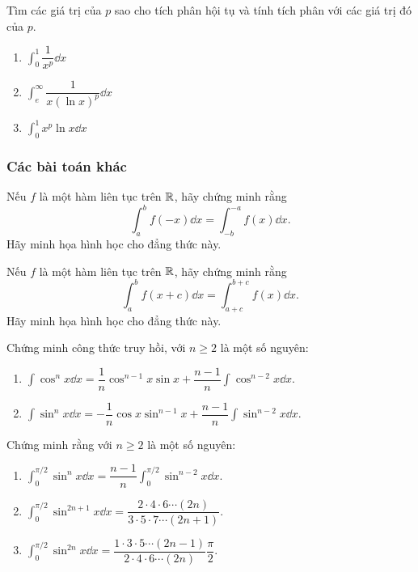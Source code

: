 \begin{exercise}
    Tìm các giá trị của $p$ sao cho tích phân hội tụ và tính tích phân với các giá trị đó của $p$.
    \begin{enumerate}[label=(\alph*)]
        \item $\int_0^1 \dfrac{1}{x^p} \dd x$
        \item $\int_e^\infty \dfrac{1}{x(\ln x)^p} \dd x$
        \item $\int_0^1 x^p \ln x \dd x$
    \end{enumerate}
\end{exercise}

\subsubsection{Các bài toán khác}

\begin{exercise}
    Nếu $f$ là một hàm liên tục trên $\mathbb{R}$, hãy chứng minh rằng
    \[ \int_a^b f(-x) \dd x = \int_{-b}^{-a} f(x) \dd x. \]
    Hãy minh họa hình học cho đẳng thức này.
\end{exercise}

\begin{exercise}
    Nếu $f$ là một hàm liên tục trên $\mathbb{R}$, hãy chứng minh rằng
    \[ \int_a^b f(x+c) \dd x = \int_{a+c}^{b+c} f(x) \dd x. \]
    Hãy minh họa hình học cho đẳng thức này.
\end{exercise}

\begin{exercise}
    Chứng minh công thức truy hồi, với $n \ge 2$ là một số nguyên:
    \begin{enumerate}[label=(\alph*)]
        \item $\int \cos^n x \dd x = \dfrac{1}{n}\cos^{n-1}x \sin x + \dfrac{n-1}{n}\int \cos^{n-2}x \dd x.$
        \item $\int \sin^n x \dd x = -\dfrac{1}{n}\cos x \sin^{n-1}x + \dfrac{n-1}{n}\int \sin^{n-2}x \dd x.$
    \end{enumerate}
\end{exercise}

\begin{exercise}
    Chứng minh rằng với $n \ge 2$ là một số nguyên:
    \begin{enumerate}[label=(\alph*)]
        \item $\int_0^{\pi/2} \sin^n x \dd x = \dfrac{n-1}{n} \int_0^{\pi/2} \sin^{n-2} x \dd x.$
        \item $\int_0^{\pi/2} \sin^{2n+1} x \dd x = \dfrac{2 \cdot 4 \cdot 6 \cdots (2n)}{3 \cdot 5 \cdot 7 \cdots (2n+1)}.$
        \item $\int_0^{\pi/2} \sin^{2n} x \dd x = \dfrac{1 \cdot 3 \cdot 5 \cdots (2n-1)}{2 \cdot 4 \cdot 6 \cdots (2n)} \dfrac{\pi}{2}.$
    \end{enumerate}
\end{exercise}

